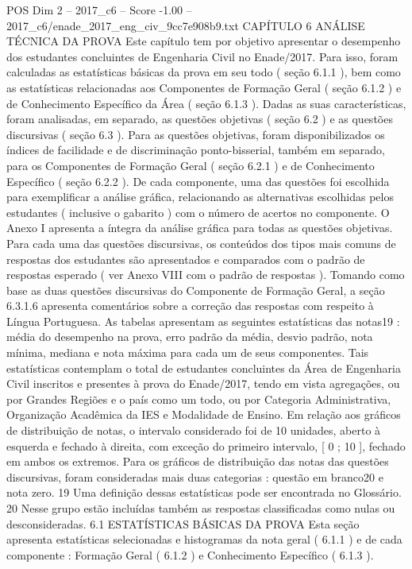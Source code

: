 \begin{textsample}{POS Dim 2 – 2017\_c6 – Score -1.00 – 2017\_c6/enade\_2017\_eng\_civ\_9cc7e908b9.txt}  \label{ex:f2_pos_272}
CAPÍTULO 6 ANÁLISE TÉCNICA DA PROVA Este capítulo tem por objetivo apresentar o desempenho dos estudantes concluintes de Engenharia Civil no Enade/2017.
Para isso, foram calculadas as estatísticas básicas da prova em seu todo ( seção 6.1.1 ), bem como as estatísticas relacionadas aos Componentes de Formação Geral ( seção 6.1.2 ) e de Conhecimento Específico da Área ( seção 6.1.3 ).
Dadas as suas características, foram analisadas, em separado, as questões objetivas ( seção 6.2 ) e as questões discursivas ( seção 6.3 ).
Para as questões objetivas, foram disponibilizados os índices de facilidade e de discriminação ponto-bisserial, também em separado, para os Componentes de Formação Geral ( seção 6.2.1 ) e de Conhecimento Específico ( seção 6.2.2 ).
De cada componente, uma das questões foi escolhida para exemplificar a análise gráfica, relacionando as alternativas escolhidas pelos estudantes ( inclusive o gabarito ) com o número de acertos no componente.
O Anexo I apresenta a íntegra da análise gráfica para todas as questões objetivas.
Para cada uma das questões discursivas, os conteúdos dos tipos mais comuns de respostas dos estudantes são apresentados e comparados com o padrão de respostas esperado ( ver Anexo VIII com o padrão de respostas ).
Tomando como base as duas questões discursivas do Componente de Formação Geral, a seção 6.3.1.6 apresenta comentários sobre a correção das respostas com respeito à Língua Portuguesa.
As tabelas apresentam as seguintes estatísticas das notas19 : média do desempenho na prova, erro padrão da média, desvio padrão, nota mínima, mediana e nota máxima para cada um de seus componentes.
Tais estatísticas contemplam o total de estudantes concluintes da Área de Engenharia Civil inscritos e presentes à prova do Enade/2017, tendo em vista agregações, ou por Grandes Regiões e o país como um todo, ou por Categoria Administrativa, Organização Acadêmica da IES e Modalidade de Ensino.
Em relação aos gráficos de distribuição de notas, o intervalo considerado foi de 10 unidades, aberto à esquerda e fechado à direita, com exceção do primeiro intervalo, [ 0 ; 10 ], fechado em ambos os extremos.
Para os gráficos de distribuição das notas das questões discursivas, foram consideradas mais duas categorias : questão em branco20 e nota zero. 19 Uma definição dessas estatísticas pode ser encontrada no Glossário. 20 Nesse grupo estão incluídas também as respostas classificadas como nulas ou desconsideradas. 6.1 ESTATÍSTICAS BÁSICAS DA PROVA Esta seção apresenta estatísticas selecionadas e histogramas da nota geral ( 6.1.1 ) e de cada componente : Formação Geral ( 6.1.2 ) e Conhecimento Específico ( 6.1.3 ).

\end{textsample}
